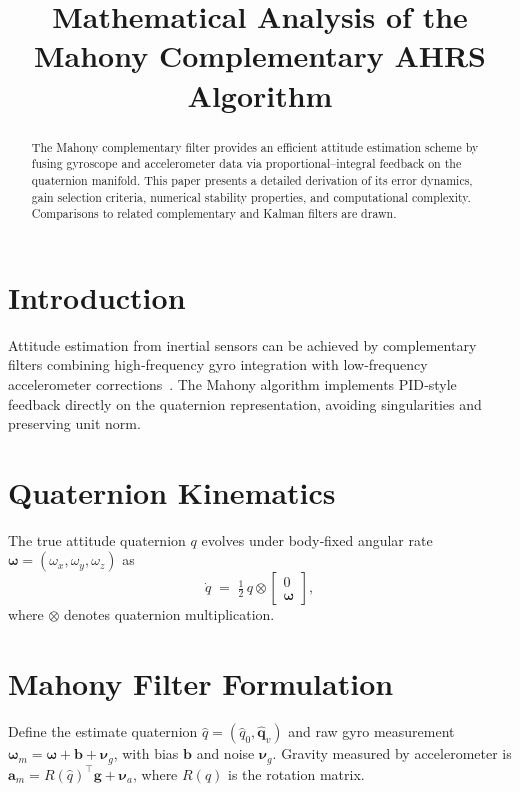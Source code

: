 \documentclass[12pt]{article}
\title{Mathematical Analysis of the Mahony Complementary AHRS Algorithm}
\date{}
\begin{document}
\maketitle

\begin{abstract}
The Mahony complementary filter provides an efficient attitude estimation scheme by fusing gyroscope and accelerometer data via proportional–integral feedback on the quaternion manifold.  This paper presents a detailed derivation of its error dynamics, gain selection criteria, numerical stability properties, and computational complexity.  Comparisons to related complementary and Kalman filters are drawn.
\end{abstract}

\section{Introduction}
Attitude estimation from inertial sensors can be achieved by complementary filters combining high‐frequency gyro integration with low‐frequency accelerometer corrections~\cite{Mahony2008}.  The Mahony algorithm implements PID‐style feedback directly on the quaternion representation, avoiding singularities and preserving unit norm.

\section{Quaternion Kinematics}
The true attitude quaternion \(q\) evolves under body‐fixed angular rate \(\boldsymbol\omega=(\omega_x,\omega_y,\omega_z)\) as
\begin{equation}
\dot q \;=\; \tfrac12\,q \otimes \begin{bmatrix}0\\\boldsymbol\omega\end{bmatrix},
\label{eq:quat_kin}
\end{equation}
where \(\otimes\) denotes quaternion multiplication.

\section{Mahony Filter Formulation}
Define the estimate quaternion \(\hat q=(\hat q_0,\hat{\mathbf q}_v)\) and raw gyro measurement \(\boldsymbol\omega_m=\boldsymbol\omega+\mathbf{b}+\boldsymbol\nu_g\), with bias \(\mathbf{b}\) and noise \(\boldsymbol\nu_g\).  Gravity measured by accelerometer is \(\mathbf a_m = R(\hat q)^\top\mathbf g + \boldsymbol\nu_a\), where \(R(\hat q)\) is the rotation matrix.
\end{document}
